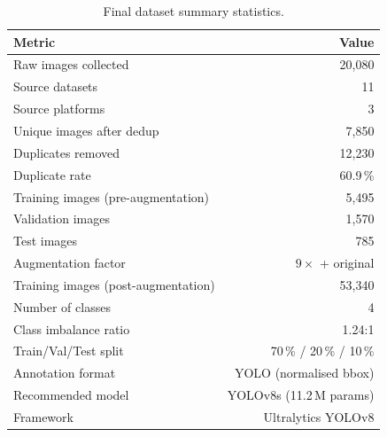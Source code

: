\documentclass[a4paper,12pt,twoside]{report}
\begin{document}
\begin{table}[htbp]
  \centering
  \caption{Final dataset summary statistics.}
  \label{tab:app-summary}
  \begin{tabular}{lr}
    \toprule
    \textbf{Metric} & \textbf{Value} \\
    \midrule
    Raw images collected            & 20{,}080 \\
    Source datasets                 & 11 \\
    Source platforms                & 3 \\
    Unique images after dedup       & 7{,}850 \\
    Duplicates removed              & 12{,}230 \\
    Duplicate rate                  & 60.9\,\% \\
    \midrule
    Training images (pre-augmentation) & 5{,}495 \\
    Validation images                  & 1{,}570 \\
    Test images                        & 785 \\
    \midrule
    Augmentation factor             & $9\times$ + original \\
    Training images (post-augmentation) & 53{,}340 \\
    \midrule
    Number of classes               & 4 \\
    Class imbalance ratio           & 1.24:1 \\
    Train/Val/Test split            & 70\,\% / 20\,\% / 10\,\% \\
    Annotation format               & YOLO (normalised bbox) \\
    \midrule
    Recommended model               & YOLOv8s (11.2\,M params) \\
    Framework                       & Ultralytics YOLOv8 \\
    \bottomrule
  \end{tabular}
\end{table}
\end{document}
